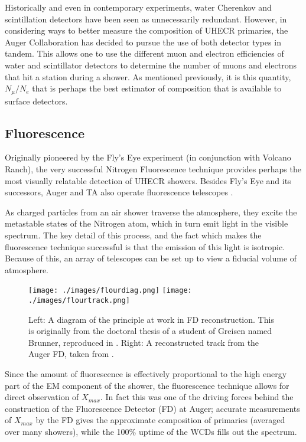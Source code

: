 Historically and even in contemporary experiments, water Cherenkov and scintillation detectors have been seen as unnecessarily redundant. However, in considering ways to better measure the composition of UHECR primaries, the Auger Collaboration has decided to pursue the use of both detector types in tandem. This allows one to use the different muon and electron efficiencies of water and scintillator detectors to determine the number of muons and electrons that hit a station during a shower. As mentioned previously, it is this quantity, $N_\mu/N_e$ that is perhaps the best estimator of composition that is available to surface detectors.


\subsection{Fluorescence}
\label{fluor}
Originally pioneered by the Fly's Eye experiment (in conjunction with Volcano Ranch), the very successful Nitrogen Fluorescence technique provides perhaps the most visually relatable detection of UHECR showers. Besides Fly's Eye and its successors, Auger and TA also operate fluorescence telescopes \cite{ultraray,flyseye}. 

As charged particles from an air shower traverse the atmosphere, they excite the metastable states of the Nitrogen atom, which in turn emit light in the visible spectrum. The key detail of this process, and the fact which makes the fluorescence technique successful is that the emission of this light is isotropic. Because of this, an array of telescopes can be set up to view a fiducial volume of atmosphere. 
\begin{figure}[h!]
\begin{center}
\texttt{[image: ./images/flourdiag.png]}
\texttt{[image: ./images/flourtrack.png]}
\caption[Fluorescence Reconstruction]{Left: A diagram of the principle at work in FD reconstruction. This is originally from the doctoral thesis of a student of Greisen named Brunner, reproduced in \cite{ultraray}. Right: A reconstructed track from the Auger FD, taken from \cite{fluorauger}.}
\label{fluorpics}
\end{center}
\end{figure}
Since the amount of fluorescence is effectively proportional to the high energy part of the EM component of the shower, the fluorescence technique allows for direct observation of $X_{max}$. In fact this was one of the driving forces behind the construction of the Fluorescence Detector (FD) at Auger; accurate measurements of $X_{max}$ by the FD gives the approximate composition of primaries (averaged over many showers), while the 100\% uptime of the WCDs fills out the spectrum. 

